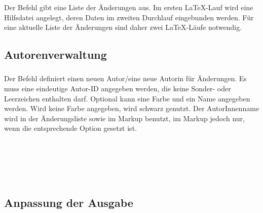 \subsubsection{}
\DescribeMacro{\listofchanges}

Der Befehl  gibt eine Liste der Änderungen aus.
Im ersten \LaTeX-Lauf wird eine Hilfsdatei angelegt, deren Daten im zweiten Durchlauf eingebunden werden.
Für eine aktuelle Liste der Änderungen sind daher zwei \LaTeX-Läufe notwendig.
\begin{chusage}
		\>
\end{chusage}


\subsection{Autorenverwaltung}
\label{sec:user:authormanagement}

\subsubsection{}

Der Befehl  definiert einen neuen Autor/eine neue Autorin für Änderungen.
Es muss eine eindeutige Autor-ID angegeben werden, die keine Sonder- oder Leerzeichen enthalten darf.
Optional kann eine Farbe und ein Name angegeben werden.
Wird keine Farbe angegeben, wird schwarz genutzt.
Der AutorInnenname wird in der Änderungsliste sowie im Markup benutzt, im Markup jedoch nur, wenn die entsprechende Option gesetzt ist.
\begin{chusage}
		\>\\
	\usageexample
		\>\\
		\>\\
		\>\\
		\>
\end{chusage}

\subsection{Anpassung der Ausgabe}
\label{sec:user:customizingoutput}

